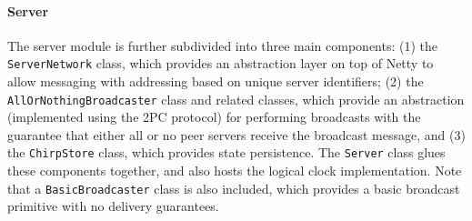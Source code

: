 \paragraph{Server}

The server module is further subdivided into three main components: (1) the \texttt{ServerNetwork} class, which provides an abstraction layer on top of Netty to allow messaging with addressing based on unique server identifiers; (2) the \texttt{AllOrNothingBroadcaster} class and related classes, which provide an abstraction (implemented using the 2PC protocol) for performing broadcasts with the guarantee that either all or no peer servers receive the broadcast message, and (3) the \texttt{ChirpStore} class, which provides state persistence. The \texttt{Server} class glues these components together, and also hosts the logical clock implementation. Note that a \texttt{BasicBroadcaster} class is also included, which provides a basic broadcast primitive with no delivery guarantees.











